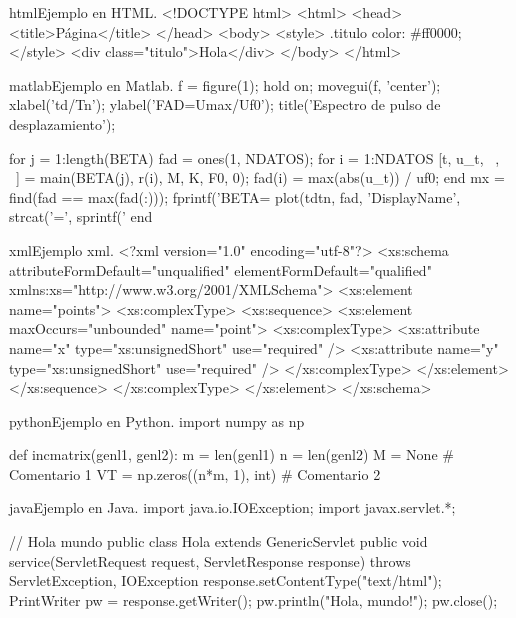 \begin{sourcecode}[\label{codigo-html}]{html}{Ejemplo en HTML.}
<!DOCTYPE html>
<html>
<head>
	<title>Página</title>
</head>
<body>
	<style>
		.titulo {
			color: #ff0000;
		}
	</style>
	<div class="titulo">Hola</div>
</body>
</html>
\end{sourcecode}

\begin{sourcecode}[\label{codigo-matlab}]{matlab}{Ejemplo en Matlab.}
f = figure(1);
hold on;
movegui(f, 'center');
xlabel('td/Tn'); ylabel('FAD=Umax/Uf0');
title('Espectro de pulso de desplazamiento');

for j = 1:length(BETA)
	fad = ones(1, NDATOS); %
	for i = 1:NDATOS
		[t, u_t, ~, ~] = main(BETA(j), r(i), M, K, F0, 0);
		fad(i) = max(abs(u_t)) / uf0;
	end
mx = find(fad == max(fad(:)));
fprintf('BETA=%
plot(tdtn, fad, 'DisplayName', strcat('\beta=', sprintf('%
end	
\end{sourcecode}

\begin{sourcecode}[]{xml}{Ejemplo xml.}
<?xml version="1.0" encoding="utf-8"?>
<xs:schema attributeFormDefault="unqualified" elementFormDefault="qualified"
xmlns:xs="http://www.w3.org/2001/XMLSchema">
	<xs:element name="points">
		<xs:complexType>
			<xs:sequence>
				<xs:element maxOccurs="unbounded" name="point">
					<xs:complexType>
						<xs:attribute name="x" type="xs:unsignedShort" use="required" />
						<xs:attribute name="y" type="xs:unsignedShort" use="required" />
					</xs:complexType>
				</xs:element>
			</xs:sequence>
		</xs:complexType>
	</xs:element>
</xs:schema>
\end{sourcecode}

\begin{sourcecode}[\label{codigo-python}]{python}{Ejemplo en Python.}
import numpy as np

def incmatrix(genl1, genl2):
m = len(genl1)
n = len(genl2)
M = None # Comentario 1
VT = np.zeros((n*m, 1), int) # Comentario 2
\end{sourcecode}

\begin{sourcecode}[\label{codigo-java}]{java}{Ejemplo en Java.}
import java.io.IOException; 
import javax.servlet.*;

// Hola mundo
public class Hola extends GenericServlet {
	public void service(ServletRequest request, ServletResponse response)
	throws ServletException, IOException{
		response.setContentType("text/html");
		PrintWriter pw = response.getWriter();
		pw.println("Hola, mundo!");
		pw.close();
	}
}
\end{sourcecode}

